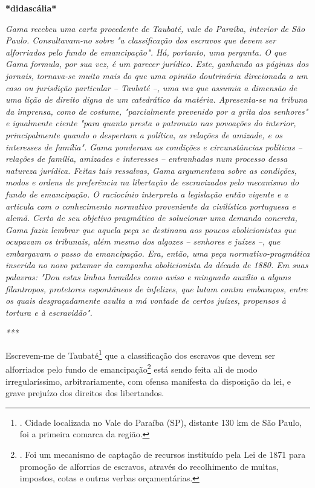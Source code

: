\textbf{*didascália*}

\emph{Gama recebeu uma carta procedente de Taubaté, vale do Paraíba,
interior de São Paulo. Consultavam-no sobre "a classificação dos
escravos que devem ser alforriados pelo fundo de emancipação". Há,
portanto, uma pergunta. O que Gama formula, por sua vez, é um parecer
jurídico. Este, ganhando as páginas dos jornais, tornava-se muito mais
do que uma opinião doutrinária direcionada a um caso ou jurisdição
particular -- Taubaté --, uma vez que assumia a dimensão de uma lição de
direito digna de um catedrático da matéria. Apresenta-se na tribuna da
imprensa, como de costume, "parcialmente prevenido por a grita dos
senhores" e igualmente ciente "para quanto presta o patronato nas
povoações do interior, principalmente quando o despertam a política, as
relações de amizade, e os interesses de família". Gama ponderava as
condições e circunstâncias políticas -- relações de família, amizades e
interesses -- entranhadas num processo dessa natureza jurídica. Feitas
tais ressalvas, Gama argumentava sobre as condições, modos e ordens de
preferência na libertação de escravizados pelo mecanismo do fundo de
emancipação. O raciocínio interpreta a legislação então vigente e a
articula com o conhecimento normativo proveniente da civilística
portuguesa e alemã. Certo de seu objetivo pragmático de solucionar uma
demanda concreta, Gama fazia lembrar que aquela peça se destinava aos
poucos abolicionistas que ocupavam os tribunais, além mesmo dos algozes
-- senhores e juízes --, que embargavam o passo da emancipação. Era,
então, uma peça normativo-pragmática inserida no novo patamar da
campanha abolicionista da década de 1880. Em suas palavras: "Dou estas
linhas humildes como aviso e minguado auxílio a alguns filantropos,
protetores espontâneos de infelizes, que lutam contra embaraços, entre
os quais desgraçadamente avulta a má vontade de certos juízes, propensos
à tortura e à escravidão".}

\emph{***}

Escrevem-me de Taubaté\footnote{. Cidade localizada no Vale do Paraíba
  (SP), distante 130 km de São Paulo, foi a primeira comarca da região.}
que a classificação dos escravos que devem ser alforriados pelo fundo de
emancipação\footnote{. Foi um mecanismo de captação de recursos
  instituído pela Lei de 1871 para promoção de alforrias de escravos,
  através do recolhimento de multas, impostos, cotas e outras verbas
  orçamentárias.} está sendo feita ali de modo irregularíssimo,
arbitrariamente, com ofensa manifesta da disposição da lei, e grave
prejuízo dos direitos dos libertandos.

